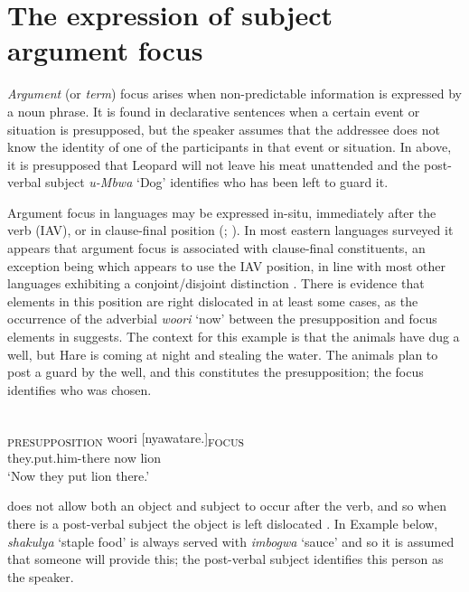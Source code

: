 \documentclass[output=paper]{langsci/langscibook}
\begin{document}
\section{The expression of subject argument focus}\label{§4:expression.nicolle}

\textit{Argument} (or \textit{term}) focus arises when non-predictable information is expressed by a noun phrase. It is found in declarative sentences when a certain event or situation is presupposed, but the speaker assumes that the addressee does not know the identity of one of the participants in that event or situation. In  above, it is presupposed that Leopard will not leave his meat unattended and the post-verbal subject \textit{u}\textit{-Mbwa} ‘Dog’ identifies who has been left to guard it.

Argument focus in  languages may be expressed in-situ, immediately after the verb (IAV), or in clause-final position (\citealt[761--762]{yoneda2011}; \citealt{gibsonetaltoappear}). In most eastern  languages surveyed it appears that argument focus is associated with clause-final constituents, an exception being  which appears to use the IAV position, in line with most other  languages exhibiting a conjoint/disjoint distinction \citep{gibsonetaltoappear}. There is evidence that elements in this position are right dislocated in at least some cases, as the occurrence of the adverbial \textit{woori} ‘now’ between the presupposition and focus elements in  suggests. The context for this example is that the animals have dug a well, but Hare is coming at night and stealing the water. The animals plan to post a guard by the well, and this constitutes the presupposition; the focus identifies who was chosen.

\ea\label{ex:16.nicolle}
\\
\gll [Mbamuta-ko]\textsubscript{PRESUPPOSITION} woori [nyawatare.]\textsubscript{FOCUS}\\
{\db}they.put.him-there now {\db}lion\\
\glt ‘Now they put lion there.’
\z

 does not allow both an object and subject to occur after the verb, and so when there is a post-verbal subject the object is left dislocated \citep[91]{leach2015}. In Example  below, \textit{shakulya} ‘staple food’ is always served with \textit{imbogwa} ‘sauce’ and so it is assumed that someone will provide this; the post-verbal subject identifies this person as the speaker.
\end{document}
